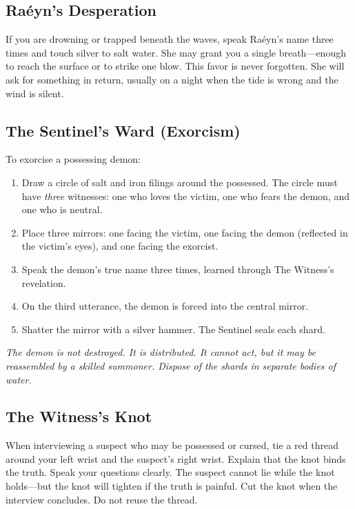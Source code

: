 \subsection{Raéyn's Desperation}

If you are drowning or trapped beneath the waves, speak Raéyn's name three times and touch silver to salt water. She may grant you a single breath---enough to reach the surface or to strike one blow. This favor is never forgotten. She will ask for something in return, usually on a night when the tide is wrong and the wind is silent.

\subsection{The Sentinel's Ward (Exorcism)}

To exorcise a possessing demon:
\begin{enumerate}
  \item Draw a circle of salt and iron filings around the possessed. The circle must have \emph{three} witnesses: one who loves the victim, one who fears the demon, and one who is neutral.
  \item Place three mirrors: one facing the victim, one facing the demon (reflected in the victim's eyes), and one facing the exorcist.
  \item Speak the demon's true name three times, learned through The Witness's revelation.
  \item On the third utterance, the demon is forced into the central mirror.
  \item Shatter the mirror with a silver hammer. The Sentinel seals each shard.
\end{enumerate}
\emph{The demon is not destroyed. It is distributed. It cannot act, but it may be reassembled by a skilled summoner. Dispose of the shards in separate bodies of water.}

\subsection{The Witness's Knot}

When interviewing a suspect who may be possessed or cursed, tie a red thread around your left wrist and the suspect's right wrist. Explain that the knot binds the truth. Speak your questions clearly. The suspect cannot lie while the knot holds---but the knot will tighten if the truth is painful. Cut the knot when the interview concludes. Do not reuse the thread.

